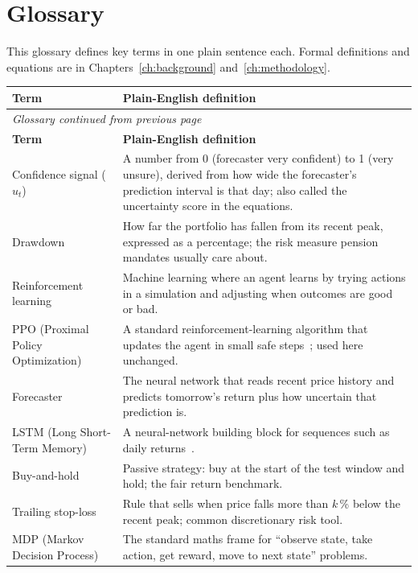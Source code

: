 \chapter{Glossary}
\label{app:glossary}

This glossary defines key terms in one plain sentence each. Formal definitions and equations are in Chapters~\ref{ch:background} and~\ref{ch:methodology}.

\begin{longtable}{p{4.2cm} p{10cm}}
\toprule
\textbf{Term} & \textbf{Plain-English definition} \\
\midrule
\endfirsthead
\multicolumn{2}{l}{\small\itshape Glossary continued from previous page} \\
\toprule
\textbf{Term} & \textbf{Plain-English definition} \\
\midrule
\endhead
\bottomrule
\endlastfoot
Confidence signal ($u_t$) & A number from 0 (forecaster very confident) to 1 (very unsure), derived from how wide the forecaster's prediction interval is that day; also called the uncertainty score in the equations. \\
\addlinespace
Drawdown & How far the portfolio has fallen from its recent peak, expressed as a percentage; the risk measure pension mandates usually care about. \\
\addlinespace
Reinforcement learning & Machine learning where an agent learns by trying actions in a simulation and adjusting when outcomes are good or bad. \\
\addlinespace
PPO (Proximal Policy Optimization) & A standard reinforcement-learning algorithm that updates the agent in small safe steps~\parencite{schulman2017ppo}; used here unchanged. \\
\addlinespace
Forecaster & The neural network that reads recent price history and predicts tomorrow's return plus how uncertain that prediction is. \\
\addlinespace
LSTM (Long Short-Term Memory) & A neural-network building block for sequences such as daily returns~\parencite{hochreiter1997lstm}. \\
\addlinespace
Buy-and-hold & Passive strategy: buy at the start of the test window and hold; the fair return benchmark. \\
\addlinespace
Trailing stop-loss & Rule that sells when price falls more than $k$\,\% below the recent peak; common discretionary risk tool. \\
\addlinespace
MDP (Markov Decision Process) & The standard maths frame for ``observe state, take action, get reward, move to next state'' problems. \\

\end{longtable}
